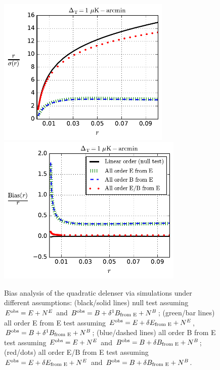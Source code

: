 \documentclass[iop,apj, numberedappendix]{emulateapj}
\begin{document}
\begin{figure}
\centering
\includegraphics[height=2.8in]{f4a.pdf}
\includegraphics[height=2.8in]{f4b.pdf}
\caption{\label{fig:f4}
Bias analysis of the quadratic delenser via simulations under different assumptions:
(black/solid lines) null test assuming $E^{\rm obs} = E + N^E$ and
$B^{\rm obs} = B + \delta^1B_{\text{\rm from E}} + N^B$;
(green/bar lines) all order E from E test assuming
$E^{\rm obs} = E + \delta E_{\text{\rm from E}} + N^E$,
$B^{\rm obs} = B + \delta^1B_{\text{\rm from E}} + N^B$;
(blue/dashed lines) all order B from E test assuming
$E^{\rm obs} = E + N^E$ and
$B^{\rm obs} = B +  \delta B_{\text{\rm from E}} + N^B$;
(red/dots) all order E/B from E test assuming
$E^{\rm obs} = E + \delta E_{\text{\rm from E}} + N^E$ and
$B^{\rm obs} = B +  \delta B_{\text{\rm from E}} + N^B$.
}
\end{figure}
\end{document}
